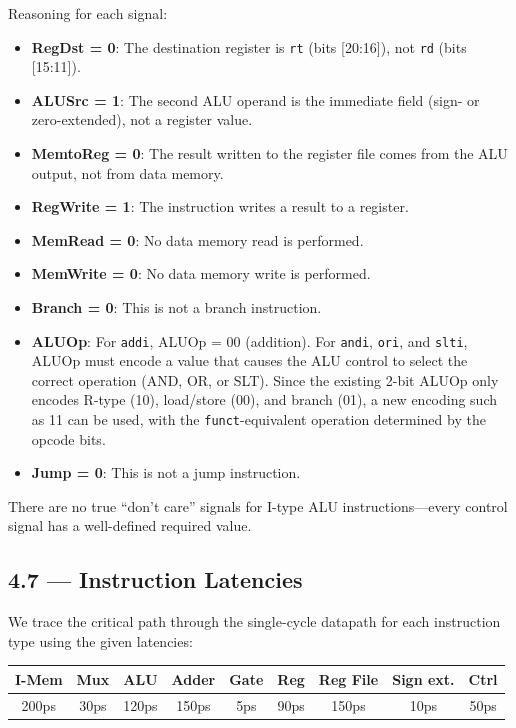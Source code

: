 Reasoning for each signal:
\begin{itemize}
  \item \textbf{RegDst = 0}: The destination register is \texttt{rt}
        (bits [20:16]), not \texttt{rd} (bits [15:11]).
  \item \textbf{ALUSrc = 1}: The second ALU operand is the immediate field
        (sign- or zero-extended), not a register value.
  \item \textbf{MemtoReg = 0}: The result written to the register file comes
        from the ALU output, not from data memory.
  \item \textbf{RegWrite = 1}: The instruction writes a result to a register.
  \item \textbf{MemRead = 0}: No data memory read is performed.
  \item \textbf{MemWrite = 0}: No data memory write is performed.
  \item \textbf{Branch = 0}: This is not a branch instruction.
  \item \textbf{ALUOp}: For \texttt{addi}, ALUOp = 00 (addition).  For
        \texttt{andi}, \texttt{ori}, and \texttt{slti}, ALUOp must encode a
        value that causes the ALU control to select the correct operation
        (AND, OR, or SLT).  Since the existing 2-bit ALUOp only encodes
        R-type (10), load/store (00), and branch (01), a new encoding such
        as 11 can be used, with the \texttt{funct}-equivalent operation
        determined by the opcode bits.
  \item \textbf{Jump = 0}: This is not a jump instruction.
\end{itemize}

\noindent There are no true ``don't care'' signals for I-type ALU
instructions---every control signal has a well-defined required value.

\subsection*{4.7 --- Instruction Latencies}
\hypertarget{sol-4.7}{}

We trace the critical path through the single-cycle datapath for each
instruction type using the given latencies:

\begin{center}
\begin{tabular}{ccccccccc}
\toprule
\textbf{I-Mem} & \textbf{Mux} & \textbf{ALU} & \textbf{Adder} &
\textbf{Gate} & \textbf{Reg} & \textbf{Reg File} &
\textbf{Sign ext.} & \textbf{Ctrl} \\
\midrule
200ps & 30ps & 120ps & 150ps & 5ps & 90ps & 150ps & 10ps & 50ps \\
\bottomrule
\end{tabular}
\end{center}

